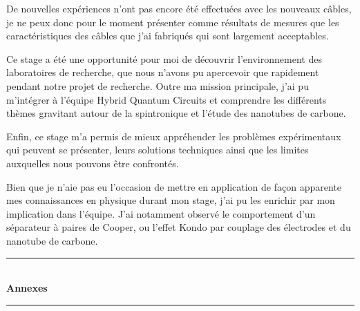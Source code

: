 \documentclass[a4paper,12pt]{report}
\begin{document}
De nouvelles expériences n'ont pas encore été effectuées avec les nouveaux câbles, je ne peux donc pour le moment présenter comme résultats de mesures que les caractéristiques des câbles que j'ai fabriqués qui sont largement acceptables.\newline

Ce stage a été une opportunité pour moi de découvrir l'environnement des laboratoires de recherche, que nous n'avons pu apercevoir que rapidement pendant notre projet de recherche. Outre ma mission principale, j'ai pu m'intégrer à l'équipe Hybrid Quantum Circuits et comprendre les différents thèmes gravitant autour de la spintronique et l'étude des nanotubes de carbone.\newline

Enfin, ce stage m'a permis de mieux appréhender les problèmes expérimentaux qui peuvent se présenter, leurs solutions techniques ainsi que les limites auxquelles nous pouvons être confrontés.\newline

Bien que je n'aie pas eu l'occasion de mettre  en application de façon apparente mes connaissances en physique durant mon stage, j'ai pu les enrichir par mon implication dans l'équipe. J'ai notamment observé le comportement d'un séparateur à paires de Cooper, ou l'effet Kondo par couplage des électrodes et du nanotube de carbone.



\listoffigures
\newpage
\appendix
{}
{}

\vspace*{8cm}
\begin{center}
\rule{\linewidth}{0.5mm}\\[0.7cm]
{\huge{\bfseries Annexes}}\\[0.4cm]
\rule{\linewidth}{0.5mm}\\[0.5cm]


\end{center}
\newpage
{}
{}

\end{document}
